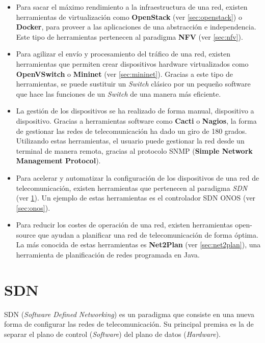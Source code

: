\begin{itemize}
	\item Para sacar el máximo rendimiento a la infraestructura de una red, existen herramientas de virtualización como \textbf{OpenStack} (ver \ref{sec:openstack}) o \textbf{Docker}, para proveer a las aplicaciones de una abstracción e independencia. Este tipo de herramientas pertenecen al paradigma \textbf{NFV} (ver \ref{sec:nfv}).
	
	\item Para agilizar el envío y procesamiento del tráfico de una red, existen herramientas que permiten crear dispositivos hardware virtualizados como \textbf{OpenVSwitch} o \textbf{Mininet} (ver \ref{sec:mininet}). Gracias a este tipo de herramientas, se puede sustituir un \textit{Switch} clásico por un pequeño software que hace las funciones de un \textit{Switch} de una manera más eficiente.
	
	\item La gestión de los dispositivos se ha realizado de forma manual, dispositivo a dispositivo. Gracias a herramientas software como \textbf{Cacti} o \textbf{Nagios}, la forma de gestionar las redes de telecomunicación ha dado un giro de 180 grados. Utilizando estas herramientas, el usuario puede gestionar la red desde un terminal de manera remota, gracias al protocolo SNMP (\textbf{Simple Network Management Protocol}).
	
	\item Para acelerar y automatizar la configuración de los dispositivos de una red de telecomunicación, existen herramientas que pertenecen al paradigma \textit{SDN} (ver \ref{sec:sdn}). Un ejemplo de estas herramientas es el controlador SDN ONOS (ver \ref{sec:onos}).
	
	\item Para reducir los costes de operación de una red, existen herramientas open-source que ayudan a planificar una red de telecomunicación de forma óptima. La más conocida de estas herramientas es \textbf{Net2Plan} (ver \ref{sec:net2plan}), una herramienta de planificación de redes programada en Java.
\end{itemize}

\section{SDN}
\label{sec:sdn}

SDN (\textit{Software Defined Networking}) es un paradigma que consiste en una nueva forma de configurar las redes de telecomunicación. Su principal premisa es la de separar el plano de control (\textit{Software}) del plano de datos (\textit{Hardware}).

